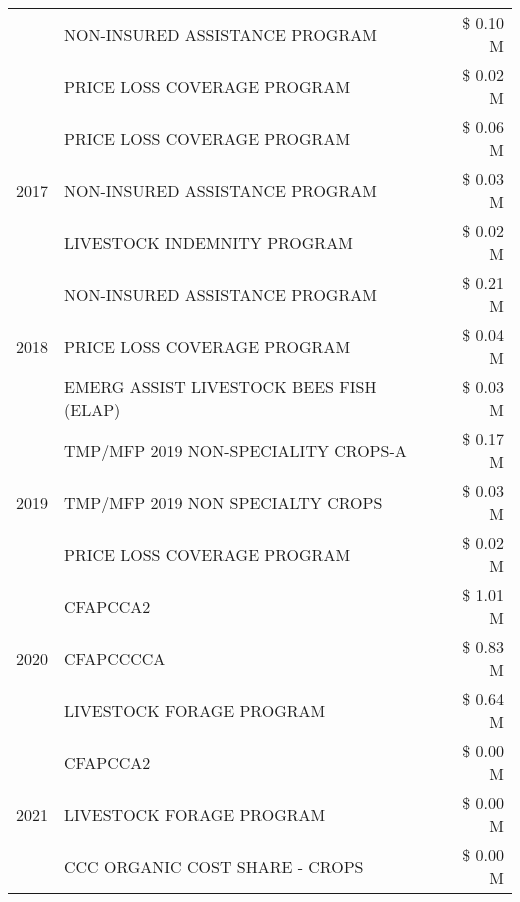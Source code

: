 \begin{tabular}{llr}
 & NON-INSURED ASSISTANCE PROGRAM & \$ 0.10 M \\
 & PRICE LOSS COVERAGE PROGRAM & \$ 0.02 M \\
\cline{1-3}
\multirow[t]{3}{*}{2017} & PRICE LOSS COVERAGE PROGRAM & \$ 0.06 M \\
 & NON-INSURED ASSISTANCE PROGRAM & \$ 0.03 M \\
 & LIVESTOCK INDEMNITY PROGRAM & \$ 0.02 M \\
\cline{1-3}
\multirow[t]{3}{*}{2018} & NON-INSURED ASSISTANCE PROGRAM & \$ 0.21 M \\
 & PRICE LOSS COVERAGE PROGRAM & \$ 0.04 M \\
 & EMERG ASSIST LIVESTOCK BEES FISH (ELAP) & \$ 0.03 M \\
\cline{1-3}
\multirow[t]{3}{*}{2019} & TMP/MFP 2019 NON-SPECIALITY CROPS-A & \$ 0.17 M \\
 & TMP/MFP 2019 NON SPECIALTY CROPS & \$ 0.03 M \\
 & PRICE LOSS COVERAGE PROGRAM & \$ 0.02 M \\
\cline{1-3}
\multirow[t]{3}{*}{2020} & CFAPCCA2 & \$ 1.01 M \\
 & CFAPCCCCA & \$ 0.83 M \\
 & LIVESTOCK FORAGE PROGRAM & \$ 0.64 M \\
\cline{1-3}
\multirow[t]{3}{*}{2021} & CFAPCCA2 & \$ 0.00 M \\
 & LIVESTOCK FORAGE PROGRAM & \$ 0.00 M \\
 & CCC ORGANIC COST SHARE - CROPS & \$ 0.00 M \\
\cline{1-3}
\bottomrule
\end{tabular}
